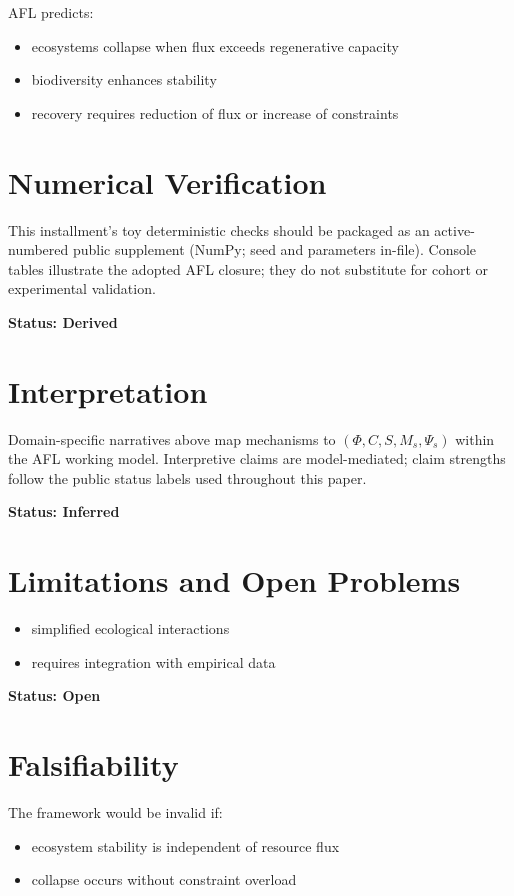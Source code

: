 \documentclass[11pt]{article}
\begin{document}
AFL predicts:

\begin{itemize}
    \item ecosystems collapse when flux exceeds regenerative capacity
    \item biodiversity enhances stability
    \item recovery requires reduction of flux or increase of constraints
\end{itemize}

\section{Numerical Verification}
This installment's toy deterministic checks should be packaged as an active-numbered public supplement (NumPy; seed and parameters in-file). Console tables illustrate the adopted AFL closure; they do not substitute for cohort or experimental validation.

\textbf{Status: Derived}

\section{Interpretation}
Domain-specific narratives above map mechanisms to $(\Phi, C, S, M_s, \Psi_s)$ within the AFL working model. Interpretive claims are model-mediated; claim strengths follow the public status labels used throughout this paper.

\textbf{Status: Inferred}

\section{Limitations and Open Problems}

\begin{itemize}
    \item simplified ecological interactions
    \item requires integration with empirical data
\end{itemize}

\textbf{Status: Open}

\section{Falsifiability}

The framework would be invalid if:

\begin{itemize}
    \item ecosystem stability is independent of resource flux
    \item collapse occurs without constraint overload
\end{itemize}
\end{document}
